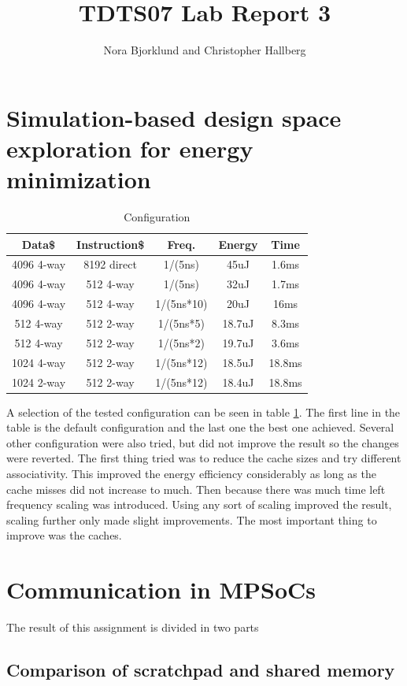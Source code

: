 \documentclass[a4paper, 12pt]{article}
\title{TDTS07 Lab Report 3}
\author{Nora Bjorklund and Christopher Hallberg}
\begin{document}
\maketitle


\section{Simulation-based design space exploration for energy minimization}

\begin{table}[h]
  \centering
  \begin{tabular}{c c c c c}
    \hline
    Data\$ & Instruction\$ & Freq. & Energy & Time \\
    \hline
    4096 4-way & 8192 direct & 1/(5ns) & 45uJ & 1.6ms \\
    4096 4-way & 512 4-way & 1/(5ns) & 32uJ & 1.7ms \\
    4096 4-way & 512 4-way & 1/(5ns*10) & 20uJ & 16ms \\
    512 4-way & 512 2-way & 1/(5ns*5) & 18.7uJ & 8.3ms \\
    512 4-way & 512 2-way & 1/(5ns*2) & 19.7uJ & 3.6ms \\
    1024 4-way & 512 2-way & 1/(5ns*12) & 18.5uJ & 18.8ms \\
    \hline
    1024 2-way & 512 2-way & 1/(5ns*12) & 18.4uJ & 18.8ms \\
  \end{tabular}
  \caption{Configuration}
  \label{fig:conf}
\end{table}
A selection of the tested configuration can be seen in table \ref{fig:conf}.
The first line in the table is the default configuration and the last one the
best one achieved. Several other configuration were also tried, but did not
improve the result so the changes were reverted. The first thing tried was to
reduce the cache sizes and try different associativity. This improved the energy
efficiency considerably as long as the cache misses did not increase to much.
Then because there was much time left frequency scaling was introduced. Using
any sort of scaling improved the result, scaling further only made slight
improvements. The most important thing to improve was the caches. 

\section{Communication in MPSoCs}
The result of this assignment is divided in two parts
\subsection{Comparison of scratchpad and shared memory}
\end{document}
